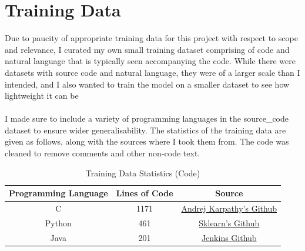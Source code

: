 \documentclass[12pt]{scrreprt}
\begin{document}
\newpage 
\section{Training Data}

Due to paucity of appropriate training data for this project with respect to scope and relevance, I curated my own small training dataset comprising of code and natural language that is typically seen accompanying the code. While there were datasets with source code and natural language, they were of a larger scale than I intended, and I also wanted to train the model on a smaller dataset to see how lightweight it can be \\ 
\\ I made sure to include a variety of programming languages in the source_code dataset to ensure wider generalisability. The statistics of the training data are given as follows, along with the sources where I took them from. The code was cleaned to remove comments and other non-code text.



\begin{table}[h]
    \centering
    \begin{tabular}{|c|c|c|}
        \hline
        \textbf{Programming Language} & \textbf{Lines of Code} & Source \\
        \hline
        C & 1171 & \href{https://github.com/karpathy/llm.c/blob/master/train_gpt2.c}{Andrej Karpathy's Github} \\
        \hline
        Python & 461 & \href{https://github.com/scikit-learn/scikit-learn/blob/main/sklearn/covariance/_robust_covariance.py}{Sklearn's Github} \\
        \hline
        Java & 201 & \href{https://github.com/jenkinsci/jenkins/tree/master}{Jenkins Github} \\
        \hline
    \end{tabular}
    \caption{Training Data Statistics (Code)}
    \label{tab:training-data}
\end{table}
\end{document}
